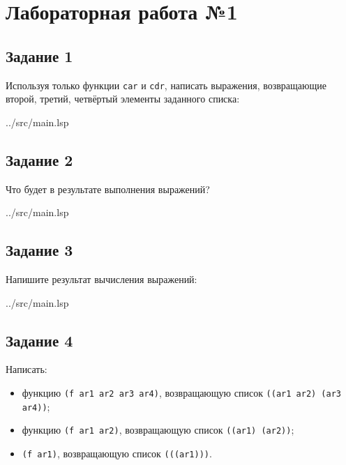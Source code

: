 \chapter*{Лабораторная работа №1}

\section*{Задание 1}

Используя только функции {\texttt{car}} и {\texttt{cdr}}, написать выражения, возвращающие второй, третий, четвёртый элементы заданного списка:

\begin{lstinputlisting}[
	caption={Задание 1},
	label={lst:t1},
	style={lsp},
	linerange={3-7},
	]{../src/main.lsp}
\end{lstinputlisting}

\section*{Задание 2}

Что будет в результате выполнения выражений?

\begin{lstinputlisting}[
	caption={Задание 2},
	label={lst:t2},
	style={lsp},
	linerange={11-14},
	]{../src/main.lsp}
\end{lstinputlisting}

\section*{Задание 3}

Напишите результат вычисления выражений:

\begin{lstinputlisting}[
	caption={Задание 3},
	label={lst:t3},
	style={lsp},
	linerange={16-31},
	]{../src/main.lsp}
\end{lstinputlisting}

\section*{Задание 4}

Написать:
\begin{itemize}
	\item функцию {\texttt{(f ar1 ar2 ar3 ar4)}}, возвращающую список {\texttt{((ar1 ar2) (ar3 ar4))}};
	\item функцию {\texttt{(f ar1 ar2)}}, возвращающую список {\texttt{((ar1) (ar2))}};
	\item {\texttt{(f ar1)}}, возвращающую список {\texttt{(((ar1)))}}.
\end{itemize}

